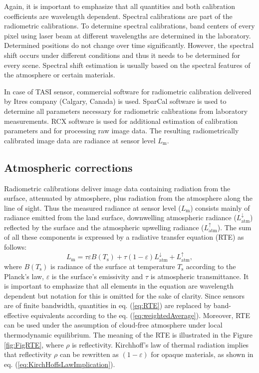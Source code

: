 Again, it is important to emphasize that all quantities and both calibration coefficients are wavelength dependent. Spectral calibrations are part of the radiometric calibrations. To determine spectral calibrations, band centers of every pixel using laser beam at different wavelengths are determined in the laboratory. Determined positions do not change over time significantly. However, the spectral shift occurs under different conditions and thus it needs to be determined for every scene. Spectral shift estimation is usually based on the spectral features of the atmosphere or certain materials.

In case of TASI sensor, commercial software for radiometric calibration delivered by Itres company (Calgary, Canada) is used. SparCal software \cite{software:SparCal} is used to determine all parameters necessary for radiometric calibrations from laboratory measurements. RCX software \cite{software:RCX} is used for additional  estimation of calibration parameters and for processing raw image data. The resulting radiometrically calibrated image data are radiance at sensor level $L_\mathrm{m}$.

\subsection*{Atmospheric corrections}

Radiometric calibrations deliver image data containing radiation from the surface, attenuated by atmosphere, plus radiation from the atmosphere along the line of sight. Thus the measured radiance at sensor level ($L_\mathrm{m}$) consists mainly of radiance emitted from the land surface, downwelling atmospheric radiance ($L^\downarrow_\mathrm{atm}$) reflected by the surface and the atmospheric upwelling radiance ($L^\uparrow_\mathrm{atm}$). The sum of all these components is expressed by a radiative transfer equation (RTE) as follows:
\begin{equation} 
\label{eq:RTE}
L_\mathrm{m} = \tau \varepsilon B(T_\mathrm{s}) + \tau (1 - \varepsilon) L^\downarrow_\mathrm{atm} + L^\uparrow_\mathrm{atm},
\end{equation}
where $B(T_\mathrm{s})$ is radiance of the surface at temperature $T_\mathrm{s}$ according to the Planck's law, $\varepsilon$ is the surface's emissivity and $\tau$ is atmospheric transmittance. It is important to emphasize that all elements in the equation are wavelength dependent but notation for this is omitted for the sake of clarity. Since sensors are of finite bandwidth, quantities in eq. (\ref{eq:RTE}) are replaced by band-effective equivalents according to the eq. (\ref{eq:weightedAverage}). Moreover, RTE can be used under the assumption of cloud-free atmosphere under local thermodynamic equilibrium. The meaning of the RTE is illustrated in the Figure \ref{fig:FigRTE}, where $\rho$ is reflectivity. Kirchhoff's law of thermal radiation implies that reflectivity $\rho$ can be rewritten as $(1 - \varepsilon)$ for opaque materials, as shown in eq. (\ref{eq:KirchHoffsLawImplication}).

